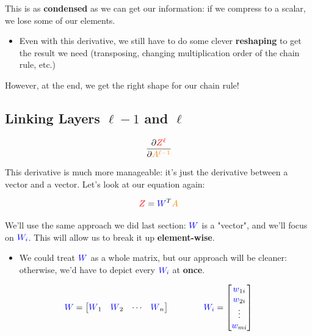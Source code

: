         This is as \textbf{condensed} as we can get our information: if we compress to a scalar, we lose some of our elements.

        \begin{itemize}
            \item Even with this derivative, we still have to do some clever \textbf{reshaping} to get the result we need (transposing, changing multiplication order of the chain rule, etc.)
        \end{itemize} 
        
        However, at the end, we get the right shape for our chain rule!
        
    \secdiv
            
    \subsection{Linking Layers $\ell-1$ and $\ell$}
                
        \begin{equation}
            \frac{\partial \textcolor{red}{Z^\ell}}{\partial \textcolor{orange}{A^{\ell-1}}}
        \end{equation}
        
        This derivative is much more manageable: it's just the derivative between a vector and a vector. Let's look at our equation again:
        
        \begin{equation}
            \textcolor{red}{Z} = \textcolor{blue}{W}^T\textcolor{orange}{A}
        \end{equation}
        
        We'll use the same approach we did last section: $\textcolor{blue}{W}$ is a "vector", and we'll focus on $\textcolor{blue}{W_i}$. This will allow us to break it up \textbf{element-wise}.

        \begin{itemize}
            \item We could treat $\textcolor{blue}{W}$ as a whole matrix, but our approach will be cleaner: otherwise, we'd have to depict every $\textcolor{blue}{W_i}$ at \textbf{once}.
        \end{itemize}
        
        \begin{equation}
            \textcolor{blue}{W}
            =
            \begin{bmatrix}
                \textcolor{blue}{W}_1 & \textcolor{blue}{W}_2 & \cdots & \textcolor{blue}{W}_n
            \end{bmatrix}
            \qquad\qquad
            \textcolor{blue}{W_i} = 
            \begin{bmatrix}
                \textcolor{blue}{w}_{1i} \\ \textcolor{blue}{w}_{2i} \\ \vdots \\ \textcolor{blue}{w}_{mi}
            \end{bmatrix}
        \end{equation}
        
